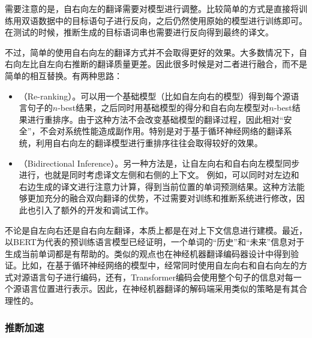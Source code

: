 \parinterval 需要注意的是，自右向左的翻译需要对模型进行调整。比较简单的方式是直接将训练用双语数据中的目标语句子进行反向，之后仍然使用原始的模型进行训练即可。在测试的时候，推断生成的目标语词串也需要进行反向得到最终的译文。

\parinterval 不过，简单的使用自右向左的翻译方式并不会取得更好的效果。大多数情况下，自右向左比自左向右推断的翻译质量更差。因此很多时候是对二者进行融合，而不是简单的相互替换。有两种思路：

\begin{itemize}
\vspace{0.5em}
\item {\small{}}（Re-ranking）。可以用一个基础模型（比如自左向右的模型）得到每个源语言句子的$n$-best结果，之后同时用基础模型的得分和自右向左模型对$n$-best结果进行重排序\cite{DBLP:conf/wmt/SennrichHB16,DBLP:conf/wmt/LiLXLLLWZXWFCLL19}。由于这种方法不会改变基础模型的翻译过程，因此相对``安全''，不会对系统性能造成副作用。特别是对于基于循环神经网络的翻译系统，利用自右向左的翻译模型进行重排序往往会取得较好的效果。
\vspace{0.5em}
\item {\small{}}（Bidirectional Inference）。另一种方法是，让自左向右和自右向左模型同步进行，也就是同时考虑译文左侧和右侧的上下文\cite{DBLP:conf/aaai/ZhangSQLJW18}。 例如，可以同时对左边和右边生成的译文进行注意力计算，得到当前位置的单词预测结果。这种方法能够更加充分的融合双向翻译的优势，不过需要对训练和推断系统进行修改，因此也引入了额外的开发和调试工作。
\vspace{0.5em}
\end{itemize}

\parinterval 不论是自左向右还是自右向左翻译，本质上都是在对上下文信息进行建模。最近，以BERT为代表的预训练语言模型已经证明，一个单词的``历史''和``未来''信息对于生成当前单词都是有帮助的\cite{DBLP:conf/naacl/DevlinCLT19}。类似的观点也在神经机器翻译编码器设计中得到验证。比如，在基于循环神经网络的模型中，经常同时使用自左向右和自右向左的方式对源语言句子进行编码，还有，Transformer编码会使用整个句子的信息对每一个源语言位置进行表示。因此，在神经机器翻译的解码端采用类似的策略是有其合理性的。


\subsubsection{推断加速}
\label{subsection-7.4.1.3}

